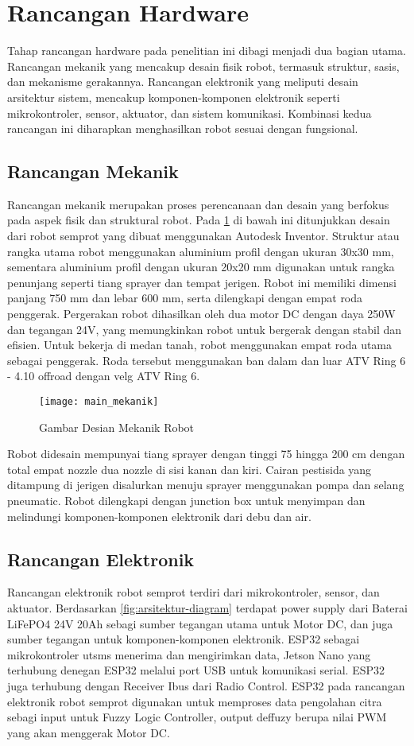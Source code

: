 \section{Rancangan Hardware}
Tahap rancangan hardware pada penelitian ini dibagi menjadi dua bagian utama. Rancangan mekanik yang mencakup desain fisik robot, termasuk struktur, sasis, dan mekanisme gerakannya. Rancangan elektronik yang meliputi desain arsitektur sistem, mencakup komponen-komponen elektronik seperti mikrokontroler, sensor, aktuator, dan sistem komunikasi. Kombinasi kedua rancangan ini diharapkan menghasilkan robot sesuai dengan fungsional.

\subsection{Rancangan Mekanik}
Rancangan mekanik merupakan proses perencanaan dan desain yang berfokus pada aspek fisik dan struktural robot. Pada \cref{fig:mekanik-utama} di bawah ini ditunjukkan desain dari robot semprot yang dibuat menggunakan Autodesk Inventor. Struktur atau rangka utama robot menggunakan aluminium profil dengan ukuran 30x30 mm, sementara aluminium profil dengan ukuran 20x20 mm digunakan untuk rangka penunjang seperti tiang sprayer dan tempat jerigen. Robot ini memiliki dimensi panjang 750 mm dan lebar 600 mm, serta dilengkapi dengan empat roda penggerak. Pergerakan robot dihasilkan oleh dua motor DC dengan daya 250W dan tegangan 24V, yang memungkinkan robot untuk bergerak dengan stabil dan efisien. Untuk bekerja di medan tanah, robot menggunakan empat roda utama sebagai penggerak. Roda tersebut menggunakan ban dalam dan luar ATV Ring 6 - 4.10 offroad dengan velg ATV Ring 6.
\begin{figure}[H]
	\centering
	\texttt{[image: main\_mekanik]}
	\caption{Gambar Desian Mekanik Robot}
	\label{fig:mekanik-utama}
\end{figure}

Robot didesain mempunyai tiang sprayer dengan tinggi 75 hingga 200 cm dengan total empat nozzle dua nozzle di sisi kanan dan kiri. Cairan pestisida yang ditampung di jerigen disalurkan menuju sprayer menggunakan pompa dan selang pneumatic. Robot dilengkapi dengan junction box untuk menyimpan dan melindungi komponen-komponen elektronik dari debu dan air.

\subsection{Rancangan Elektronik}
Rancangan elektronik robot semprot terdiri dari mikrokontroler, sensor, dan aktuator. Berdasarkan \cref{fig:arsitektur-diagram} terdapat power supply dari Baterai LiFePO4 24V 20Ah sebagi sumber tegangan utama untuk Motor DC, dan juga sumber tegangan untuk komponen-komponen elektronik. ESP32 sebagai mikrokontroler utsms menerima dan mengirimkan data, Jetson Nano yang terhubung denegan ESP32 melalui port USB untuk komunikasi serial. ESP32 juga terhubung dengan Receiver Ibus dari Radio Control. ESP32 pada rancangan elektronik robot semprot digunakan untuk memproses data pengolahan citra sebagi input untuk Fuzzy Logic Controller, output deffuzy berupa nilai PWM yang akan menggerak Motor DC. 

